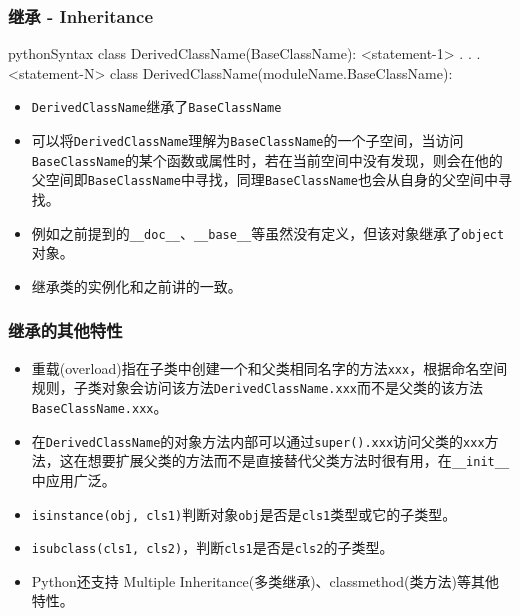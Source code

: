 \documentclass[9pt]{beamer}
\begin{document}
\begin{frame}[fragile]
    \frametitle{继承 - Inheritance}

    \begin{codebox}{python}{Syntax}
class DerivedClassName(BaseClassName):
    <statement-1>
    .
    .
    .
    <statement-N>
class DerivedClassName(moduleName.BaseClassName):
\end{codebox}

\begin{itemize}
    \item \texttt{DerivedClassName}\alert{继承}了\texttt{BaseClassName}
    \item 可以将\texttt{DerivedClassName}理解为\texttt{BaseClassName}的一个子空间，当访问\texttt{BaseClassName}的某个函数或属性时，若在当前空间中没有发现，则会在他的父空间即\texttt{BaseClassName}中寻找，同理\texttt{BaseClassName}也会从自身的父空间中寻找。
    \item 例如之前提到的\texttt{__doc__}、\texttt{__base__}等虽然没有定义，但该对象继承了\texttt{object}对象。
    \item 继承类的实例化和之前讲的一致。
\end{itemize}

\end{frame}

\begin{frame}
    \frametitle{继承的其他特性}

    \begin{itemize}
        \item 重载(overload)指在子类中创建一个和父类相同名字的方法\texttt{xxx}，根据命名空间规则，子类对象会访问该方法\texttt{DerivedClassName.xxx}而不是父类的该方法\texttt{BaseClassName.xxx}。
        \item 在\texttt{DerivedClassName}的对象方法内部可以通过\texttt{super().xxx}访问父类的\texttt{xxx}方法，这在想要扩展父类的方法而不是直接替代父类方法时很有用，在\texttt{__init__}中应用广泛。
        \item \texttt{isinstance(obj, cls1)}判断对象\texttt{obj}是否是\texttt{cls1}类型或它的子类型。
        \item \texttt{isubclass(cls1, cls2)}，判断\texttt{cls1}是否是\texttt{cls2}的子类型。
        \item Python还支持 Multiple Inheritance(多类继承)、classmethod(类方法)等其他特性。
    \end{itemize}
    
\end{frame}
\end{document}
